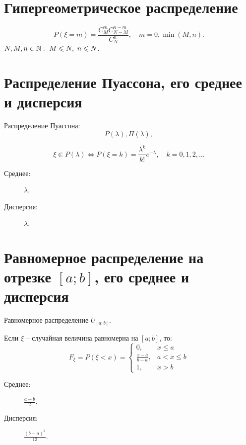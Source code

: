 \section{Гипергеометрическое распределение}

\begin{definition}
	\[
		P(\xi = m) = \frac{C_{M}^{m}C_{N-M}^{n-m}  }{C_{N}^{n} } , \quad m=\overline{0,\min(M,n)}.
	\]
	$N,M,n \in \mathbb{N}: \ M \leqslant N, \ n \leqslant N$.
\end{definition}

\newpage

\section{Распределение Пуассона, его среднее и дисперсия}

\begin{definition}
	Распределение Пуассона:
	\[
		P(\lambda ), \Pi(\lambda ),
	\]

	\[
		\xi \Subset P(\lambda ) \iff P(\xi = k) = \frac{\lambda^k}{k!} e^{-\lambda } , \quad k = 0,1,2,\ldots
	\]

	\begin{description}
		\item[Среднее:] $\lambda $.
		\item[Дисперсия:] $\lambda $.
	\end{description}
\end{definition}

\section{Равномерное распределение на отрезке $[a ; b]$, его среднее и дисперсия}

\begin{definition}
	Равномерное распределение $U_{[a ; b]} $.

	Если $\xi $ -- случайная величина равномерна на $[a ; b]$, то:
	\[
		F_{\xi } = P(\xi < x) = \left\{\begin{array}{ll}
			0,                & x \leqslant a     \\
			\frac{x-a}{b-a} , & a < x \leqslant b \\
			1,                & x > b
		\end{array}\right.
	\]

	\begin{description}
		\item[Среднее:] $\frac{a+b}{2} $.
		\item[Дисперсия:] $\frac{(b-a)^2}{12} $.
	\end{description}
\end{definition}


